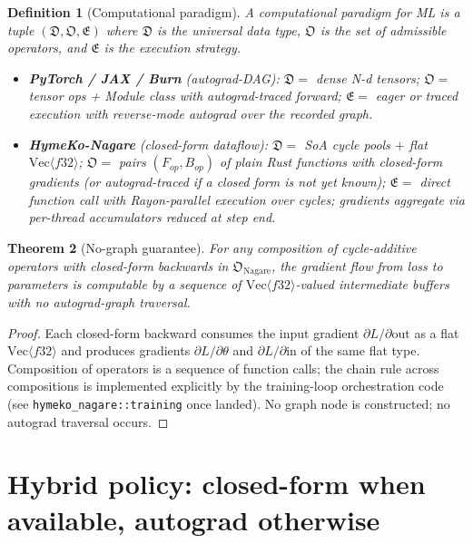\documentclass[11pt]{article}
\newtheorem{theorem}{Theorem}
\newtheorem{defn}[theorem]{Definition}
\begin{document}
\begin{defn}[Computational paradigm]
A \emph{computational paradigm} for ML is a tuple
$(\mathfrak{D}, \mathfrak{O}, \mathfrak{E})$ where
$\mathfrak{D}$ is the universal data type, $\mathfrak{O}$ is the
set of admissible operators, and $\mathfrak{E}$ is the execution
strategy.

\begin{itemize}
  \item \textbf{PyTorch / JAX / Burn} (autograd-DAG):
    $\mathfrak{D} = $ dense N-d tensors;
    $\mathfrak{O} = $ tensor ops + Module class with autograd-traced
        forward;
    $\mathfrak{E} = $ eager or traced execution with reverse-mode
        autograd over the recorded graph.
  \item \textbf{HymeKo-Nagare} (closed-form dataflow):
    $\mathfrak{D} = $ SoA cycle pools $+$ flat
        $\mathrm{Vec}\langle f32 \rangle$;
    $\mathfrak{O} = $ pairs $(F_{op}, B_{op})$ of plain Rust
        functions with closed-form gradients (or autograd-traced
        if a closed form is not yet known);
    $\mathfrak{E} = $ direct function call with Rayon-parallel
        execution over cycles; gradients aggregate via
        per-thread accumulators reduced at step end.
\end{itemize}
\end{defn}

\begin{theorem}[No-graph guarantee]
For any composition of cycle-additive operators with closed-form
backwards in $\mathfrak{O}_{\mathrm{Nagare}}$, the gradient flow
from loss to parameters is computable by a sequence of
$\mathrm{Vec}\langle f32 \rangle$-valued intermediate buffers
with no autograd-graph traversal.
\end{theorem}

\begin{proof}
Each closed-form backward consumes the input gradient
$\partial L / \partial \mathrm{out}$ as a flat
$\mathrm{Vec}\langle f32 \rangle$ and produces gradients
$\partial L / \partial \theta$ and $\partial L / \partial \mathrm{in}$
of the same flat type. Composition of operators is a sequence of
function calls; the chain rule across compositions is implemented
explicitly by the training-loop orchestration code (see
\texttt{hymeko\_nagare::training} once landed). No graph node is
constructed; no autograd traversal occurs.
\end{proof}

\section{Hybrid policy: closed-form when available, autograd otherwise}
\end{document}
